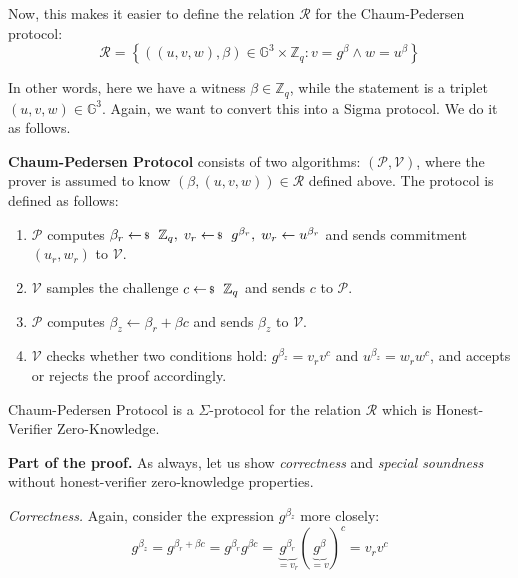 \documentclass[../lecture-notes-148x210.tex]{subfiles}
\begin{document}
Now, this makes it easier to define the relation $\mathcal{R}$ for the Chaum-Pedersen protocol:
\begin{equation*}
    \mathcal{R} = \left\{ ((u,v,w), \beta) \in \mathbb{G}^3 \times \mathbb{Z}_q: v = g^{\beta} \wedge w = u^{\beta} \right\}
\end{equation*}

In other words, here we have a witness $\beta \in \mathbb{Z}_q$, while the statement is a triplet $(u,v,w) \in \mathbb{G}^3$. Again, we want to convert this into a Sigma protocol. We do it as follows.

\begin{definition}
    \textbf{Chaum-Pedersen Protocol} consists of two algorithms: $(\mathcal{P}, \mathcal{V})$, where the prover is assumed to know $(\beta,(u,v,w)) \in \mathcal{R}$ defined above. The protocol is defined as follows:
    \begin{enumerate}
        \item $\mathcal{P}$ computes $\beta_r \leftarrowS \mathbb{Z}_q, \; v_r \leftarrowS g^{\beta_r}, \; w_r \gets u^{\beta_r}$ and sends commitment $(u_r,w_r)$ to $\mathcal{V}$.
        \item $\mathcal{V}$ samples the challenge $c \leftarrowS \mathbb{Z}_q$ and sends $c$ to $\mathcal{P}$.
        \item $\mathcal{P}$ computes $\beta_z \gets \beta_r + \beta c$ and sends $\beta_z$ to $\mathcal{V}$.
        \item $\mathcal{V}$ checks whether two conditions hold: $g^{\beta_z} = v_rv^c$ and $u^{\beta_z} = w_r w^c$, and accepts or rejects the proof accordingly.
    \end{enumerate}
\end{definition}

\begin{theorem}
    Chaum-Pedersen Protocol is a $\Sigma$-protocol for the relation $\mathcal{R}$ which is Honest-Verifier Zero-Knowledge.
\end{theorem}

\textbf{Part of the proof.} As always, let us show \textit{correctness} and \textit{special soundness} without honest-verifier zero-knowledge properties.

\textit{Correctness.} Again, consider the expression $g^{\beta_z}$ more closely:
\begin{equation*}
    g^{\beta_z} = g^{\beta_r + \beta c} = g^{\beta_r}g^{\beta c} = \underbrace{g^{\beta_r}}_{=v_r}(\underbrace{g^{\beta}}_{=v})^c = v_rv^c
\end{equation*}
\end{document}

